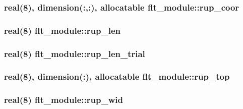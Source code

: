 \subsubsection[{rup\+\_\+coor}]{\setlength{\rightskip}{0pt plus 5cm}real(8), dimension(\+:,\+:), allocatable flt\+\_\+module\+::rup\+\_\+coor}\label{namespaceflt__module_afbf76baeddad45d761cc805c838b369a}
\hypertarget{namespaceflt__module_aa83583fdd38e91b447b8fbf1ae9f833c}{}
\subsubsection[{rup\+\_\+len}]{\setlength{\rightskip}{0pt plus 5cm}real(8) flt\+\_\+module\+::rup\+\_\+len}\label{namespaceflt__module_aa83583fdd38e91b447b8fbf1ae9f833c}
\hypertarget{namespaceflt__module_acb649d537953bd575e6bbded75b6c99b}{}
\subsubsection[{rup\+\_\+len\+\_\+trial}]{\setlength{\rightskip}{0pt plus 5cm}real(8) flt\+\_\+module\+::rup\+\_\+len\+\_\+trial}\label{namespaceflt__module_acb649d537953bd575e6bbded75b6c99b}
\hypertarget{namespaceflt__module_ab5c2fb389cfd0080d938d50ef55e28ef}{}
\subsubsection[{rup\+\_\+top}]{\setlength{\rightskip}{0pt plus 5cm}real(8), dimension(\+:), allocatable flt\+\_\+module\+::rup\+\_\+top}\label{namespaceflt__module_ab5c2fb389cfd0080d938d50ef55e28ef}
\hypertarget{namespaceflt__module_a5cbe7cb918ea3ecbe35270bdcc9ab63d}{}
\subsubsection[{rup\+\_\+wid}]{\setlength{\rightskip}{0pt plus 5cm}real(8) flt\+\_\+module\+::rup\+\_\+wid}\label{namespaceflt__module_a5cbe7cb918ea3ecbe35270bdcc9ab63d}
\hypertarget{namespaceflt__module_a6cefaab59a5e1f02e62505b132fe9384}{}
